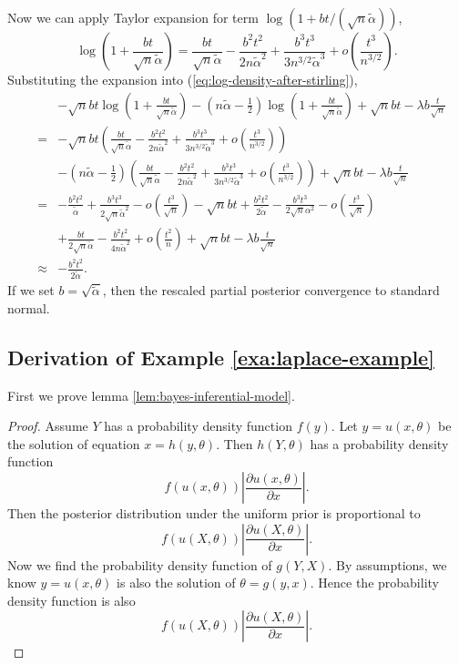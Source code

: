 Now we can apply Taylor expansion for term $\log\left(1+bt/\left(\sqrt{n}\tilde{\alpha}\right)\right)$,
\[
\log\left(1+\frac{bt}{\sqrt{n}\tilde{\alpha}}\right)=\frac{bt}{\sqrt{n}\tilde{\alpha}}-\frac{b^{2}t^{2}}{2n\tilde{\alpha}^{2}}+\frac{b^{3}t^{3}}{3n^{3/2}\tilde{\alpha}^{3}}+o\left(\frac{t^{3}}{n^{3/2}}\right).
\]
Substituting the expansion into (\ref{eq:log-density-after-stirling}),
\begin{eqnarray*}
 &  & -\sqrt{n}bt\log\left(1+\frac{bt}{\sqrt{n}\tilde{\alpha}}\right)-\left(n\tilde{\alpha}-\frac{1}{2}\right)\log\left(1+\frac{bt}{\sqrt{n}\tilde{\alpha}}\right)+\sqrt{n}bt-\lambda b\frac{t}{\sqrt{n}}\\
 & = & -\sqrt{n}bt\left(\frac{bt}{\sqrt{n}\tilde{\alpha}}-\frac{b^{2}t^{2}}{2n\tilde{\alpha}^{2}}+\frac{b^{3}t^{3}}{3n^{3/2}\tilde{\alpha}^{3}}+o\left(\frac{t^{3}}{n^{3/2}}\right)\right)\\
 &  & -\left(n\tilde{\alpha}-\frac{1}{2}\right)\left(\frac{bt}{\sqrt{n}\tilde{\alpha}}-\frac{b^{2}t^{2}}{2n\tilde{\alpha}^{2}}+\frac{b^{3}t^{3}}{3n^{3/2}\tilde{\alpha}^{3}}+o\left(\frac{t^{3}}{n^{3/2}}\right)\right)+\sqrt{n}bt-\lambda b\frac{t}{\sqrt{n}}\\
 & = & -\frac{b^{2}t^{2}}{\tilde{\alpha}}+\frac{b^{3}t^{3}}{2\sqrt{n}\tilde{\alpha}^{2}}-o\left(\frac{t^{3}}{\sqrt{n}}\right)-\sqrt{n}bt+\frac{b^{2}t^{2}}{2\tilde{\alpha}}-\frac{b^{3}t^{3}}{2\sqrt{n}\alpha^{2}}-o\left(\frac{t^{3}}{\sqrt{n}}\right)\\
 &  & +\frac{bt}{2\sqrt{n}\tilde{\alpha}}-\frac{b^{2}t^{2}}{4n\tilde{\alpha}^{2}}+o\left(\frac{t^{2}}{n}\right)+\sqrt{n}bt-\lambda b\frac{t}{\sqrt{n}}\\
 & \approx & -\frac{b^{2}t^{2}}{2\tilde{\alpha}}.
\end{eqnarray*}
If we set $b=\sqrt{\tilde{\alpha}}$, then the rescaled partial posterior
convergence to standard normal.


\subsection{\label{sub:Derivation-of-Example-3}Derivation of Example \ref{exa:laplace-example}}

 {First we prove lemma \ref{lem:bayes-inferential-model}.}
\begin{proof}
 {Assume $Y$ has a probability density function $f\left(y\right)$.
Let $y=u\left(x,\theta\right)$ be the solution of equation $x=h\left(y,\theta\right)$.
Then $h\left(Y,\theta\right)$ has a probability density function
\[
f\left(u\left(x,\theta\right)\right)\left|\frac{\partial u\left(x,\theta\right)}{\partial x}\right|.
\]
Then the posterior distribution under the uniform prior is proportional
to 
\[
f\left(u\left(X,\theta\right)\right)\left|\frac{\partial u\left(X,\theta\right)}{\partial x}\right|.
\]
Now we find the probability density function of $g\left(Y,X\right)$.
By assumptions, we know $y=u\left(x,\theta\right)$ is also the solution
of $\theta=g\left(y,x\right)$. Hence the probability density function
is also 
\[
f\left(u\left(X,\theta\right)\right)\left|\frac{\partial u\left(X,\theta\right)}{\partial x}\right|.
\]
}
\end{proof}


